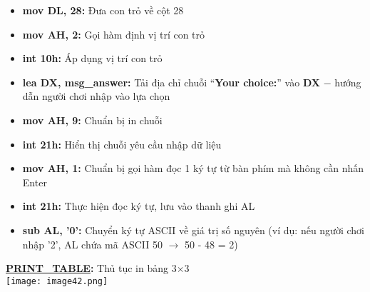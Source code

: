\begin{itemize}
    \item \textbf{mov DL, 28:} Đưa con trỏ về cột 28
    \item \textbf{mov AH, 2:} Gọi hàm định vị trí con trỏ
    \item \textbf{int 10h:} Áp dụng vị trí con trỏ
    \item \textbf{lea DX, msg\_answer:} Tải địa chỉ chuỗi “\textbf{Your choice:}” vào \textbf{DX} $-$ hướng dẫn người chơi nhập vào lựa chọn
    \item \textbf{mov AH, 9:} Chuẩn bị in chuỗi
    \item \textbf{int 21h:} Hiển thị chuỗi yêu cầu nhập dữ liệu
    \item \textbf{mov AH, 1:} Chuẩn bị gọi hàm đọc 1 ký tự từ bàn phím mà không cần nhấn Enter
    \item \textbf{int 21h:} Thực hiện đọc ký tự, lưu vào thanh ghi AL
    \item \textbf{sub AL, '0':} Chuyển ký tự ASCII về giá trị số nguyên (ví dụ: nếu người chơi nhập '2', AL chứa mã ASCII 50 $\rightarrow$ 50 - 48 = 2)
\end{itemize}


\textbf{\underline{PRINT\_TABLE}: }Thủ tục in bảng 3$\times$3\\
\texttt{[image: image42.png]}

